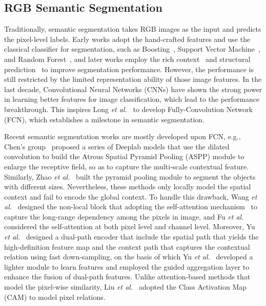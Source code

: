 \documentclass[10.5pt,twocolumn,journal,letterpaper]{IEEEtran}
\newcommand{\eg}{e.g.}
\newcommand{\etal}{\textit{et al.}}
\begin{document}
\subsection{RGB Semantic Segmentation} 
Traditionally, semantic segmentation takes RGB images as the input and predicts the pixel-level labels. Early works adopt the hand-crafted features and use the classical classifier for segmentation, such as Boosting~\cite{tu-pami2009-auto}, Support Vector Machine~\cite{fulkerson-iccv2009-class}, and Random Forest~\cite{shotton-cvpr2008-semantic}, and later works employ the rich context~\cite{carreira-eccv2012-semantic} and structural prediction~\cite{carreira-pami2011-cpmc} to improve segmentation performance. However, the performance is still restricted by the limited representation ability of those image features. In the last decade, Convolutional Neural Networks (CNNs) have shown the strong power in learning better features for image classification, which lead to the performance breakthrough. This inspires Long \etal~\cite{long-cvpr2015-fcn} to develop Fully-Convolution Network (FCN), which establishes a milestone in semantic segmentation.    

Recent semantic segmentation works are mostly developed upon FCN, \eg, Chen's group~\cite{chen-pami2017-deeplabv2, chen-arxiv2017-deeplabv3, chen-eccv2018-deeplabv3+} proposed a series of Deeplab models that use the dilated convolution to build the Atrous Spatial Pyramid Pooling (ASPP) module to enlarge the receptive field, so as to capture the multi-scale contextual feature. Similarly, Zhao \etal~\cite{zhao-cvpr2017-pspnet} built the pyramid pooling module to segment the objects with different sizes. Nevertheless, these methods only locally model the spatial context and fail to encode the global context. To handle this drawback, Wang \etal~\cite{wang-cvpr2018-nonlocal} designed the non-local block that adopting the self-attention mechanism~\cite{vaswani-nips2017-attention} to capture the long-range dependency among the pixels in image, and Fu \etal~\cite{fu-cvpr2019-danet} considered the self-attention at both pixel level and channel level. Moreover, Yu \etal~\cite{yu-eccv2018-bisenet} designed a dual-path encoder that include the spatial path that yields the high-definition feature map and the context path that captures the contextual relation using fast down-sampling, on the basis of which Yu \etal~\cite{yu-ijcv2021-bisenetv2} developed a lighter module to learn features and employed the guided aggregation layer to enhance the fusion of dual-path features. Unlike attention-based methods that model the pixel-wise similarity, Liu \etal~\cite{liu-cvpr2022-caanet} adopted the Class Activation Map (CAM) to model pixel relations. 
\end{document}
